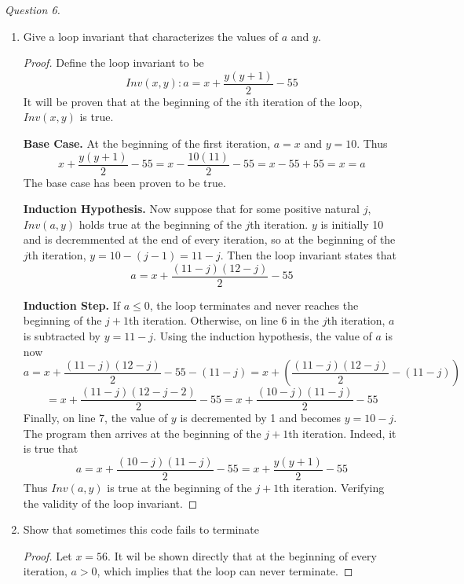 \documentclass[11pt]{article}
\begin{document}
    \textit{Question 6.}\begin{enumerate}
        \item Give a loop invariant that characterizes the values of \(a\) and \(y\).
        \begin{proof}
            Define the loop invariant to be
            \[
                Inv(x, y) : a = x + \frac{y(y+1)}{2} - 55
            \]
            It will be proven that at the beginning of the \(i\)th iteration of the loop, \(Inv(x,y)\) is true.

            \textbf{Base Case.} At the beginning of the first iteration, \(a=x\) and \(y=10\). Thus
            \[
                x + \frac{y(y+1)}{2} - 55 = x - \frac{10(11)}{2} - 55 = x - 55 + 55 = x = a
            \]
            The base case has been proven to be true.

            \textbf{Induction Hypothesis.} Now suppose that for some positive natural \(j\), \(Inv(a,y)\) holds true at the beginning of the \(j\)th iteration. \(y\) is initially 10 and is decremmented at the end of every iteration, so at the beginning of the \(j\)th iteration, \(y=10-(j-1) = 11 - j\). Then the loop invariant states that 
            \[
                a = x +\frac{(11-j)(12-j)}{2}-55
            \]

            \textbf{Induction Step.} If \(a \leq 0\), the loop terminates and never reaches the beginning of the \(j+1\)th iteration. Otherwise, on line 6 in the \(j\)th iteration, \(a\) is subtracted by \(y=11-j\). Using the induction hypothesis, the value of \(a\) is now
            \[
                a = x + \frac{(11-j)(12-j)}{2} - 55 - (11-j) = x + \left(\frac{(11-j)(12-j)}{2} - (11 - j)\right)
            \]
            \[
                = x+\frac{(11-j)(12-j-2)}{2}-55 = x+\frac{(10-j)(11-j)}{2}-55
            \]
            Finally, on line 7, the value of \(y\) is decremented by 1 and becomes \(y = 10-j\). The program then arrives at the beginning of the \(j+1\)th iteration. Indeed, it is true that
            \[
                a = x+\frac{(10-j)(11-j)}{2}-55 = x+\frac{y(y+1)}{2}-55
            \]
            Thus \(Inv(a,y)\) is true at the beginning of the \(j+1\)th iteration. Verifying the validity of the loop invariant.

        \end{proof}
        
        \item Show that sometimes this code fails to terminate
        \begin{proof}
            Let \(x=56\). It wil be shown directly that at the beginning of every iteration, \(a > 0\), which implies that the loop can never terminate.


\end{proof}
\end{enumerate}
\end{document}
